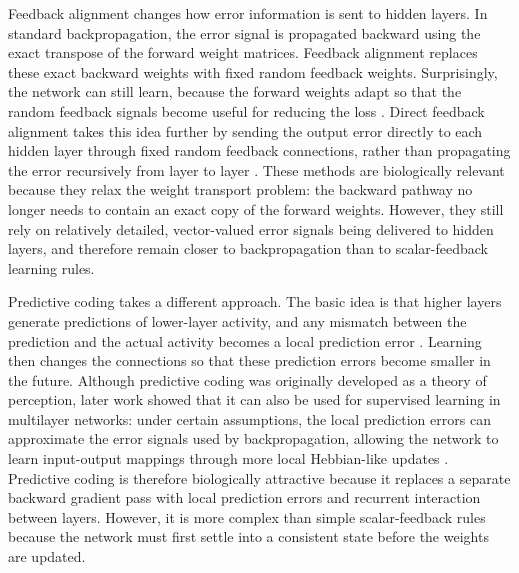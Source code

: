 Feedback alignment changes how error information is sent to hidden layers. In standard backpropagation, the error signal is propagated backward using the exact transpose of the forward weight matrices. Feedback alignment replaces these exact backward weights with fixed random feedback weights. Surprisingly, the network can still learn, because the forward weights adapt so that the random feedback signals become useful for reducing the loss \parencite{lillicrap_random_2016}. Direct feedback alignment takes this idea further by sending the output error directly to each hidden layer through fixed random feedback connections, rather than propagating the error recursively from layer to layer \parencite{nokland_direct_2016}. These methods are biologically relevant because they relax the weight transport problem: the backward pathway no longer needs to contain an exact copy of the forward weights. However, they still rely on relatively detailed, vector-valued error signals being delivered to hidden layers, and therefore remain closer to backpropagation than to scalar-feedback learning rules.

Predictive coding takes a different approach. The basic idea is that higher layers generate predictions of lower-layer activity, and any mismatch between the prediction and the actual activity becomes a local prediction error \parencite{rao_predictive_1999}. Learning then changes the connections so that these prediction errors become smaller in the future. Although predictive coding was originally developed as a theory of perception, later work showed that it can also be used for supervised learning in multilayer networks: under certain assumptions, the local prediction errors can approximate the error signals used by backpropagation, allowing the network to learn input-output mappings through more local Hebbian-like updates \parencite{whittington_approximation_2017}. Predictive coding is therefore biologically attractive because it replaces a separate backward gradient pass with local prediction errors and recurrent interaction between layers. However, it is more complex than simple scalar-feedback rules because the network must first settle into a consistent state before the weights are updated.

